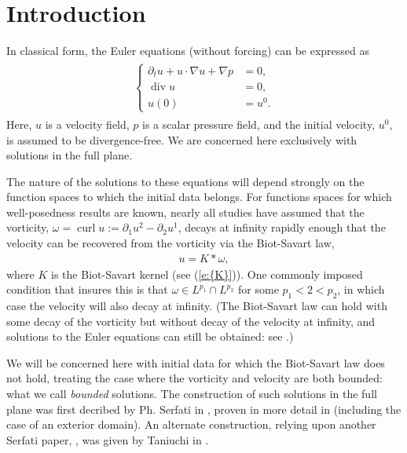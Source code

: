 \documentclass[reqno,openright,11pt,twoside]{amsart}
\theoremstyle{definition}
\numberwithin{equation}{section}
\begin{document}
    
\vspace{-0.40in}

   
{\small
\tableofcontents
}

\newpage

{} 

\section{Introduction}\label{S:Introduction}

\noindent In classical form, the Euler equations (without forcing) can be expressed as
\begin{align}\label{e:EClassical}
    \begin{split}
        \left\{
        \begin{array}{rl}
            {\ensuremath{\partial}}_t u + u \cdot {\ensuremath{\nabla}} u + {\ensuremath{\nabla}} p &= 0, \\
            \operatorname{div} u &= 0, \\
            u(0) &= u^0.
        \end{array}
        \right.
    \end{split}
\end{align}
Here, $u$ is a velocity field, $p$ is a scalar pressure field, and the initial velocity, $u^0$, is assumed to be divergence-free. We are concerned here exclusively with solutions in the full plane.

The nature of the solutions to these equations will depend strongly on the function spaces to which the initial data belongs. For functions spaces for which well-posedness results are known, nearly all studies
have assumed that the vorticity, $\omega = \operatorname{curl} u := {\ensuremath{\partial}}_1 u^2 - {\ensuremath{\partial}}_2 u^1$, decays at infinity rapidly enough that the velocity can be recovered from the vorticity via the Biot-Savart law,
\begin{align*}
    u = K * \omega,
\end{align*}
where $K$ is the Biot-Savart kernel (see {(\ref{e:{K}})}). One commonly imposed condition that insures this is that $\omega \in L^{p_1} \cap L^{p_2}$ for some $p_1 < 2 < p_2$, in which case the velocity will also decay at infinity. (The Biot-Savart law can hold with some decay of the vorticity but without decay of the velocity at infinity, and solutions to the Euler equations can still be obtained: see \cite{Brunelli2010}.)

We will be concerned here with initial data for which the Biot-Savart law does not hold, treating the case where the vorticity and velocity are both bounded: what we call \textit{bounded} solutions. The construction of such solutions in the full plane was first decribed by Ph. Serfati in \cite{Serfati1995A}, proven in more detail in \cite{AKLL2014} (including the case of an exterior domain). An alternate construction, relying upon another Serfati paper, \cite{Serfati1995B}, was given by Taniuchi in \cite{Taniuchi2004}.
\end{document}
